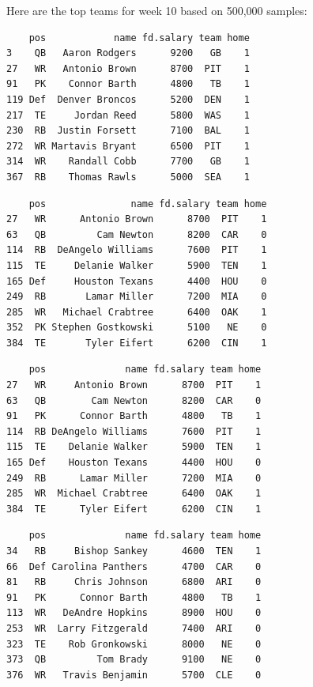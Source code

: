 \documentclass[10pt]{article}
\begin{document}
\thispagestyle{fancy}


\noindent Here are the top teams for week 10 based on 500,000 samples:
\begin{lstlisting}
    pos            name fd.salary team home
3    QB   Aaron Rodgers      9200   GB    1
27   WR   Antonio Brown      8700  PIT    1
91   PK    Connor Barth      4800   TB    1
119 Def  Denver Broncos      5200  DEN    1
217  TE     Jordan Reed      5800  WAS    1
230  RB  Justin Forsett      7100  BAL    1
272  WR Martavis Bryant      6500  PIT    1
314  WR    Randall Cobb      7700   GB    1
367  RB    Thomas Rawls      5000  SEA    1
\end{lstlisting}

\begin{lstlisting}
    pos               name fd.salary team home
27   WR      Antonio Brown      8700  PIT    1
63   QB         Cam Newton      8200  CAR    0
114  RB  DeAngelo Williams      7600  PIT    1
115  TE     Delanie Walker      5900  TEN    1
165 Def     Houston Texans      4400  HOU    0
249  RB       Lamar Miller      7200  MIA    0
285  WR   Michael Crabtree      6400  OAK    1
352  PK Stephen Gostkowski      5100   NE    0
384  TE       Tyler Eifert      6200  CIN    1
\end{lstlisting}

\begin{lstlisting}
    pos              name fd.salary team home
27   WR     Antonio Brown      8700  PIT    1
63   QB        Cam Newton      8200  CAR    0
91   PK      Connor Barth      4800   TB    1
114  RB DeAngelo Williams      7600  PIT    1
115  TE    Delanie Walker      5900  TEN    1
165 Def    Houston Texans      4400  HOU    0
249  RB      Lamar Miller      7200  MIA    0
285  WR  Michael Crabtree      6400  OAK    1
384  TE      Tyler Eifert      6200  CIN    1
\end{lstlisting}

\begin{lstlisting}
    pos              name fd.salary team home
34   RB     Bishop Sankey      4600  TEN    1
66  Def Carolina Panthers      4700  CAR    0
81   RB     Chris Johnson      6800  ARI    0
91   PK      Connor Barth      4800   TB    1
113  WR   DeAndre Hopkins      8900  HOU    0
253  WR  Larry Fitzgerald      7400  ARI    0
323  TE    Rob Gronkowski      8000   NE    0
373  QB         Tom Brady      9100   NE    0
376  WR   Travis Benjamin      5700  CLE    0
\end{lstlisting}
\end{document}
